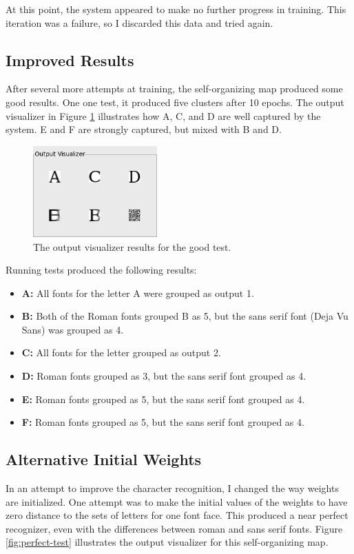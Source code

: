\documentclass[12pt,letterpaper,oneside]{report}
\begin{document}
At this point, the system appeared to make no further progress in training. This iteration was a failure, so I discarded this data and tried again.

\subsection{Improved Results}
After several more attempts at training, the self-organizing map produced some good results. One one test, it produced five clusters after 10 epochs. The output visualizer in Figure \ref{fig:good-test} illustrates how A, C, and D are well captured by the system. E and F are strongly captured, but mixed with B and D.

\begin{figure}[ht]
  \centering
  \includegraphics[width=180px]{diagrams/good-test.png} 
  \caption{The output visualizer results for the good test.}
  \label{fig:good-test}
\end{figure}

Running tests produced the following results:
\begin{itemize}
    \item\textbf{{A:}} All fonts for the letter A were grouped as output 1.
    \item\textbf{{B:}} Both of the Roman fonts grouped B as 5, but the sans serif font (Deja Vu Sans) was grouped as 4.
    \item\textbf{{C:}} All fonts for the letter grouped as output 2.
    \item\textbf{{D:}} Roman fonts grouped as 3, but the sans serif font grouped as 4.
    \item\textbf{{E:}} Roman fonts grouped as 5, but the sans serif font grouped as 4.
    \item\textbf{{F:}} Roman fonts grouped as 5, but the sans serif font grouped as 4.
\end{itemize}

\subsection{Alternative Initial Weights}
In an attempt to improve the character recognition, I changed the way weights are initialized. One attempt was to make the initial values of the weights to have zero distance to the sets of letters for one font face. This produced a near perfect recognizer, even with the differences between roman and sans serif fonts. Figure \ref{fig:perfect-test} illustrates the output visualizer for this self-organizing map.
\end{document}

